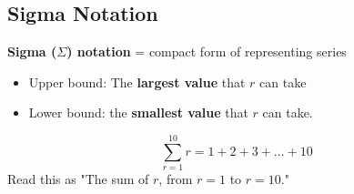 \documentclass{article}
\begin{document}
\subsection{Sigma Notation}
\textbf{Sigma ($\Sigma$) notation} = compact form of representing series
\begin{itemize}
    \item Upper bound: The \textbf{largest value} that $r$ can take
    \item Lower bound: the \textbf{smallest value} that $r$ can take.
\end{itemize}
$$ \sum_{r = 1}^{10} r = 1 + 2 + 3 + ... + 10$$
Read this as "The sum of $r$, from $r = 1$ to $r = 10$."
\end{document}
